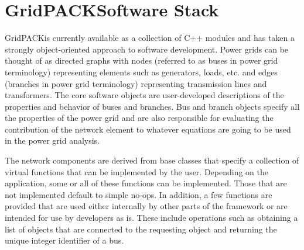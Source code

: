 \documentclass[preprint]{acm_proc_article-sp}
\begin{document}
\section{GridPACK\texttrademark Software Stack}
GridPACK\texttrademark is currently available as a collection of C++ modules and
has taken a strongly object-oriented approach to software development. Power
grids can be thought of as directed graphs with nodes (referred to as buses in
power grid terminology) representing elements such as generators, loads, etc.
and edges (branches in power grid terminology) representing transmission lines
and  transformers. The core software objects are user-developed descriptions of
the properties and behavior of buses and branches. Bus and branch objects
specify all the properties of the power grid and are also responsible for
evaluating the contribution of the network element to whatever equations are
going to be used in the power grid analysis.

The network components are derived from base classes that specify a collection
of virtual functions that can be implemented by the user. Depending on the
application, some or all of these functions can be implemented. Those that are
not implemented default to simple no-ops. In addition, a few functions are
provided that are used either internally by other parts of the framework or are
intended for use by developers as is. These include operations such as obtaining
a list of objects that are connected to the requesting object and returning the
unique integer identifier of a bus.
\end{document}
